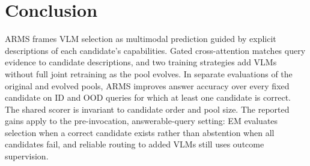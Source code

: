 \documentclass[letterpaper]{article}
\begin{document}
\section{Conclusion}

ARMS frames VLM selection as multimodal prediction guided by explicit
descriptions of each candidate's capabilities. Gated cross-attention matches
query evidence to candidate descriptions, and two training strategies add VLMs
without full joint retraining as the pool evolves. In separate evaluations of
the original and evolved pools, ARMS improves answer accuracy over every fixed
candidate on ID and OOD queries for which at least one candidate is correct.
The shared scorer is invariant to candidate order and pool size. The reported
gains apply to the pre-invocation, answerable-query setting: EM evaluates
selection when a correct candidate exists rather than abstention when all
candidates fail, and reliable routing to added VLMs still uses outcome
supervision.

\newpage

\end{document}
